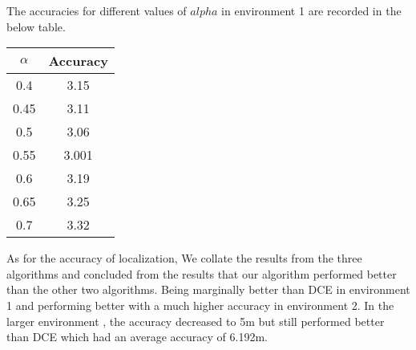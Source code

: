 \documentclass[twocolumn, 11pt]{IEEEtran}
\begin{document}
The accuracies for different values of $alpha$ in environment 1 are recorded in the below table.

\begin{center}
\begin{tabular}{ |c|c| } 
\hline
$\alpha$ & Accuracy \\
\hline
0.4  & 3.15 \\
0.45 & 3.11 \\
0.5  & 3.06 \\
0.55 & 3.001 \\
0.6  & 3.19 \\
0.65 & 3.25 \\
0.7  & 3.32  \\
\hline
\end{tabular}
\end{center}

As for the accuracy of localization, We collate the results from the three algorithms and concluded from the results that our algorithm performed better than the other two algorithms. Being marginally better than DCE in environment 1 and performing better with a much higher accuracy in environment 2. In the larger environment , the accuracy decreased to 5m but still performed better than DCE which had an average accuracy of 6.192m. 
\\


\end{document}
